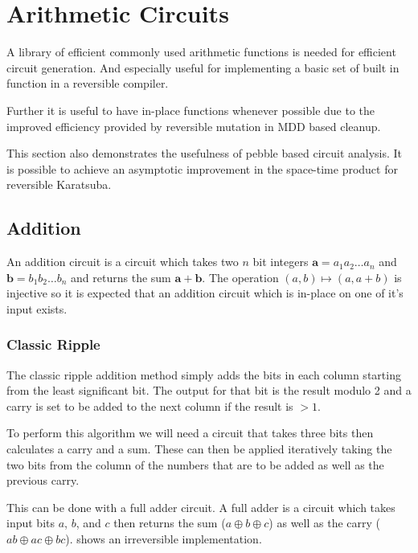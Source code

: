 \chapter{Arithmetic Circuits}

A library of efficient commonly used arithmetic functions is needed for
efficient circuit generation. And especially useful for implementing a basic set
of built in function in a reversible compiler.

Further it is useful to have in-place functions whenever possible due to the
improved efficiency provided by reversible mutation in MDD based cleanup.

This section also demonstrates the usefulness of pebble based circuit analysis.
It is possible to achieve an asymptotic improvement in the space-time product
for reversible Karatsuba.

\section{Addition}

  An addition circuit is a circuit which takes two $n$ bit integers $\mathbf{a} =
  a_1a_2\dotsc a_n$ and $\mathbf{b} = b_1b_2\dotsc b_n$ and returns the sum
  $\mathbf{a}+\mathbf{b}$. The operation $(a,b)\mapsto (a,a+b)$ is injective so
  it is expected that an addition circuit which is in-place on one of it's input exists.

  \subsection{Classic Ripple}

    The classic ripple addition method simply adds the bits in each column
    starting from the least significant bit.  The output for that bit is the
    result modulo 2 and a carry is set to be added to the next column if the
    result is $>1$.

    To perform this algorithm we will need a circuit that takes three bits then
    calculates a carry and a sum.  These can then be applied iteratively taking
    the two bits from the column of the numbers that are to be added as well as
    the previous carry.

    This can be done with a full adder circuit.  A full adder is a circuit
    which takes input bits $a$, $b$, and $c$ then returns the sum ($a \oplus b
    \oplus c$) as well as the carry ($ab\oplus ac \oplus bc$).
     shows an irreversible implementation.

